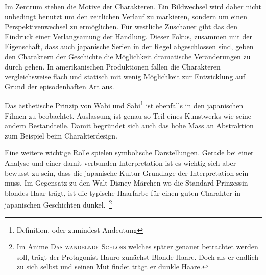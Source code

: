 Im Zentrum stehen die Motive der Charakteren. Ein Bildwechsel wird daher nicht unbedingt benutzt um den zeitlichen Verlauf zu markieren, sondern um einen Perspektivenwechsel zu ermöglichen. Für westliche Zuschauer gibt das den Eindruck einer Verlangsamung der Handlung. Dieser Fokus, zusammen mit der Eigenschaft, dass auch japanische Serien in der Regel abgeschlossen sind, geben den Charaktern der Geschichte die Möglichkeit dramatische Veränderungen zu durch gehen. In amerikanischen Produktionen fallen die Charakteren vergleichsweise flach und statisch mit wenig Möglichkeit zur Entwicklung auf Grund der episodenhaften Art aus.

Das ästhetische Prinzip von Wabi und Sabi\footnote{Definition, oder zumindest Andeutung} ist ebenfalls in den japanischen Filmen zu beobachtet. Auslassung ist genau so Teil eines Kunstwerks wie seine andern Bestandteile. Damit begründet sich auch das hohe Mass an Abstraktion zum Beispiel beim Charakterdesign.  

Eine weitere wichtige Rolle spielen symbolische Darstellungen. Gerade bei einer Analyse und einer damit verbunden Interpretation ist es wichtig sich aber bewusst zu sein, dass die japanische Kultur Grundlage der Interpretation sein muss. Im Gegensatz zu den Walt Disney Märchen wo die Standard Prinzessin blondes Haar trägt, ist die typische Haarfarbe für einen guten Charakter in japanischen Geschichten dunkel.~\footnote{Im Anime \textsc{Das wandelnde Schloss} welches später genauer betrachtet werden soll, trägt der Protagonist Hauro zunächst Blonde Haare. Doch als er endlich zu sich selbst und seinen Mut findet trägt er dunkle Haare.} 